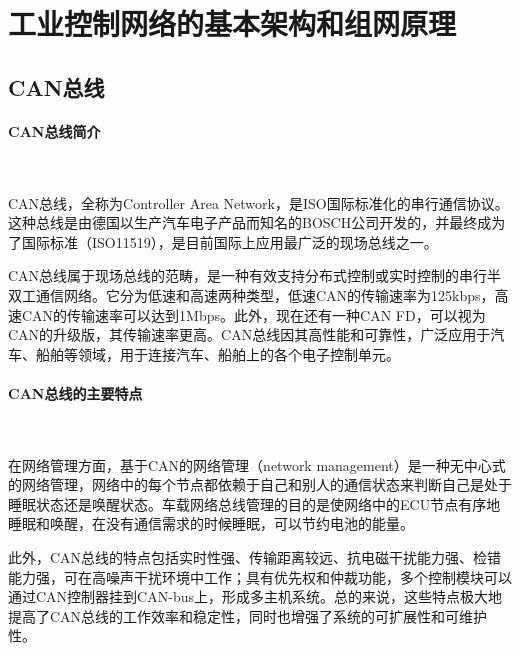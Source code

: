 \documentclass[UTF8]{article}
\begin{document}
\begin{titlepage}

\end{titlepage}

%
\section{工业控制网络的基本架构和组网原理}


\subsection{CAN总线}
\paragraph{CAN总线简介}~{}

CAN总线，全称为Controller Area Network，是ISO国际标准化的串行通信协议。这种总线是由德国以生产汽车电子产品而知名的BOSCH公司开发的，并最终成为了国际标准（ISO11519），是目前国际上应用最广泛的现场总线之一。

CAN总线属于现场总线的范畴，是一种有效支持分布式控制或实时控制的串行半双工通信网络。它分为低速和高速两种类型，低速CAN的传输速率为125kbps，高速CAN的传输速率可以达到1Mbps。此外，现在还有一种CAN FD，可以视为CAN的升级版，其传输速率更高。CAN总线因其高性能和可靠性，广泛应用于汽车、船舶等领域，用于连接汽车、船舶上的各个电子控制单元。

\paragraph{CAN总线的主要特点}~{}

在网络管理方面，基于CAN的网络管理（network management）是一种无中心式的网络管理，网络中的每个节点都依赖于自己和别人的通信状态来判断自己是处于睡眠状态还是唤醒状态。车载网络总线管理的目的是使网络中的ECU节点有序地睡眠和唤醒，在没有通信需求的时候睡眠，可以节约电池的能量。

此外，CAN总线的特点包括实时性强、传输距离较远、抗电磁干扰能力强、检错能力强，可在高噪声干扰环境中工作；具有优先权和仲裁功能，多个控制模块可以通过CAN控制器挂到CAN-bus上，形成多主机系统。总的来说，这些特点极大地提高了CAN总线的工作效率和稳定性，同时也增强了系统的可扩展性和可维护性。
\end{document}
